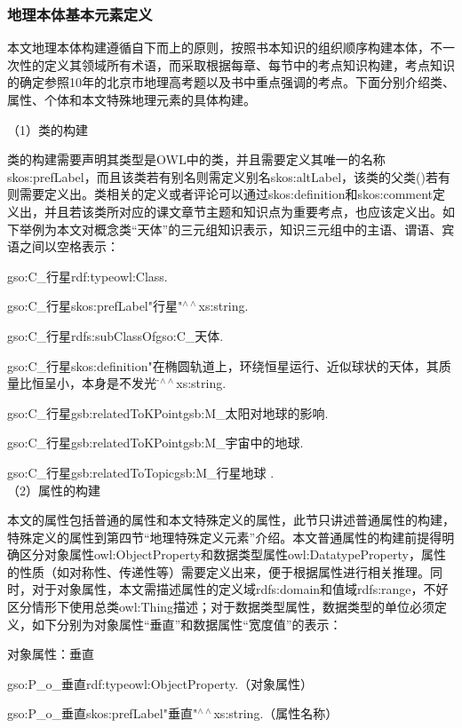 \subsubsection{地理本体基本元素定义}
本文地理本体构建遵循自下而上的原则，按照书本知识的组织顺序构建本体，不一次性的定义其领域所有术语，而采取根据每章、每节中的考点知识构建，考点知识的确定参照10年的北京市地理高考题以及书中重点强调的考点。下面分别介绍类、属性、个体和本文特殊地理元素的具体构建。

（1）类的构建

类的构建需要声明其类型是OWL中的类，并且需要定义其唯一的名称skos:prefLabel，而且该类若有别名则需定义别名skos:altLabel，该类的父类()若有则需要定义出。类相关的定义或者评论可以通过skos:definition和skos:comment定义出，并且若该类所对应的课文章节主题和知识点为重要考点，也应该定义出。如下举例为本文对概念类“天体”的三元组知识表示，知识三元组中的主语、谓语、宾语之间以空格表示：

gso:C\_行星\quad rdf:type\quad owl:Class\quad .

gso:C\_行星\quad skos:prefLabel\quad "行星"$^{\land\land}$xs:string\quad .

gso:C\_行星\quad rdfs:subClassOf\quad gso:C\_天体\quad .

gso:C\_行星\quad skos:definition\quad "在椭圆轨道上，环绕恒星运行、近似球状的天体，其质量比恒呈小，本身是不发光的\"$^{\land\land}$xs:string\quad .

gso:C\_行星\quad gsb:relatedToKPoint\quad gsb:M\_太阳对地球的影响\quad .

gso:C\_行星\quad gsb:relatedToKPoint\quad gsb:M\_宇宙中的地球\quad .

gso:C\_行星\quad gsb:relatedToTopic\quad gsb:M\_行星地球 .
\\

（2）属性的构建 

本文的属性包括普通的属性和本文特殊定义的属性，此节只讲述普通属性的构建，特殊定义的属性到第四节“地理特殊定义元素”介绍。本文普通属性的构建前提得明确区分对象属性owl:ObjectProperty和数据类型属性owl:DatatypeProperty，属性的性质（如对称性、传递性等）需要定义出来，便于根据属性进行相关推理。同时，对于对象属性，本文需描述属性的定义域rdfs:domain和值域rdfs:range，不好区分情形下使用总类owl:Thing描述；对于数据类型属性，数据类型的单位必须定义，如下分别为对象属性“垂直”和数据属性“宽度值”的表示：

对象属性：垂直

gso:P\_o\_垂直\quad rdf:type\quad owl:ObjectProperty\quad .（对象属性）

gso:P\_o\_垂直\quad skos:prefLabel\quad "垂直"$^{\land\land}$xs:string\quad .（属性名称）

